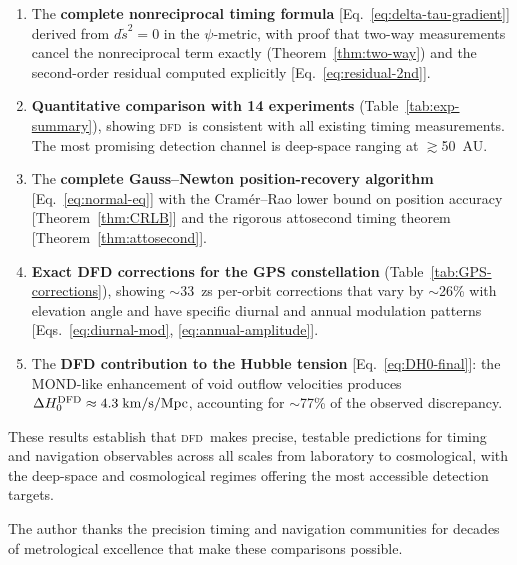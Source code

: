 \documentclass[aps,prd,twocolumn,superscriptaddress,nofootinbib,longbibliography]{revtex4-2}
\newcommand{\DFD}{\textsc{dfd}}
\begin{document}
\begin{enumerate}
\item The \textbf{complete nonreciprocal timing formula}
[Eq.~\eqref{eq:delta-tau-gradient}] derived from $d\tilde{s}^2 = 0$
in the $\psi$-metric, with proof that two-way measurements cancel the
nonreciprocal term exactly (Theorem~\ref{thm:two-way}) and the
second-order residual computed explicitly [Eq.~\eqref{eq:residual-2nd}].

\item \textbf{Quantitative comparison with 14 experiments}
(Table~\ref{tab:exp-summary}), showing \DFD\ is consistent with all
existing timing measurements. The most promising detection channel is
deep-space ranging at $\gtrsim$50~AU.

\item The \textbf{complete Gauss--Newton position-recovery algorithm}
[Eq.~\eqref{eq:normal-eq}] with the Cram\'er--Rao lower bound on
position accuracy [Theorem~\ref{thm:CRLB}] and the rigorous
attosecond timing theorem [Theorem~\ref{thm:attosecond}].

\item \textbf{Exact DFD corrections for the GPS constellation}
(Table~\ref{tab:GPS-corrections}), showing $\sim$33~zs per-orbit
corrections that vary by $\sim$26\% with elevation angle and have
specific diurnal and annual modulation patterns
[Eqs.~\eqref{eq:diurnal-mod}, \eqref{eq:annual-amplitude}].

\item The \textbf{DFD contribution to the Hubble tension}
[Eq.~\eqref{eq:DH0-final}]: the MOND-like enhancement of void outflow
velocities produces $\Delta H_0^{\rm DFD} \approx 4.3\;\si{km/s/Mpc}$,
accounting for $\sim$77\% of the observed discrepancy.
\end{enumerate}

These results establish that \DFD\ makes precise, testable predictions
for timing and navigation observables across all scales from laboratory
to cosmological, with the deep-space and cosmological regimes offering
the most accessible detection targets.

\begin{acknowledgments}
The author thanks the precision timing and navigation communities for
decades of metrological excellence that make these comparisons possible.
\end{acknowledgments}
\end{document}
